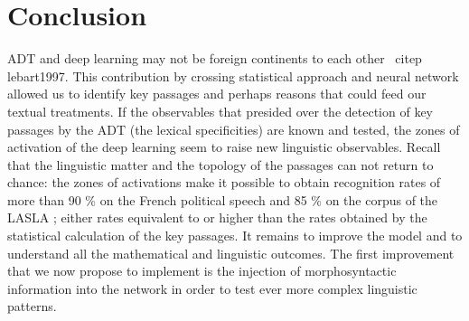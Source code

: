 \section{Conclusion}

ADT and deep learning may not be foreign continents to each other \ citep {lebart1997}. This contribution by crossing statistical approach and neural network allowed us to identify key passages and perhaps reasons that could feed our textual treatments. If the observables that presided over the detection of key passages by the ADT (the lexical specificities) are known and tested, the zones of activation of the deep learning seem to raise new linguistic observables. Recall that the linguistic matter and the topology of the passages can not return to chance: the zones of activations make it possible to obtain recognition rates of more than 90 \% on the French political speech and 85 \% on the corpus of the LASLA ; either rates equivalent to or higher than the rates obtained by the statistical calculation of the key passages. It remains to improve the model and to understand all the mathematical and linguistic outcomes. The first improvement that we now propose to implement is the injection of morphosyntactic information into the network in order to test ever more complex linguistic patterns.
